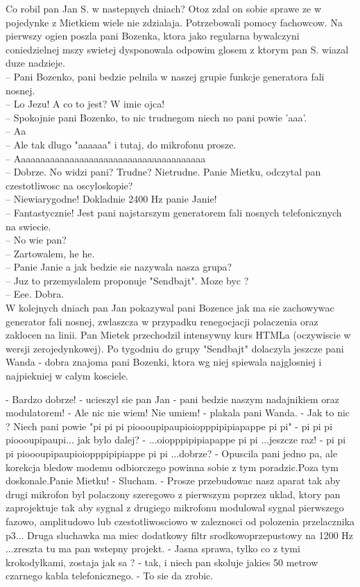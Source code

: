 \documentclass[a4paper,polish,titlepage,12pt]{article}
\begin{document}
Co robil pan Jan S. w nastepnych dniach? Otoz zdal on sobie sprawe ze w pojedynke z Mietkiem wiele nie zdzialaja. Potrzebowali pomocy fachowcow. Na pierwszy ogien poszla pani Bozenka, ktora jako regularna bywalczyni coniedzielnej mszy swietej dysponowala odpowim glosem z ktorym pan S. wiazal duze nadzieje.\\
-- Pani Bozenko, pani bedzie pelnila w naszej grupie funkcje generatora fali nosnej.\\
-- Lo Jezu! A co to jest? W imie ojca!\\
-- Spokojnie pani Bozenko, to nic trudnegom niech no pani powie 'aaa'.\\
-- Aa\\
-- Ale tak dlugo "aaaaaa" i tutaj, do mikrofonu prosze.\\
-- Aaaaaaaaaaaaaaaaaaaaaaaaaaaaaaaaaaaaaaa\\
-- Dobrze. No widzi pani? Trudne? Nietrudne. Panie Mietku, odczytal pan czestotliwosc na oscyloskopie?\\
-- Niewiarygodne! Dokladnie 2400 Hz panie Janie!\\
-- Fantastycznie! Jest pani najstarszym generatorem fali nosnych telefonicznych na swiecie.\\
-- No wie pan?\\
-- Zartowalem, he he.\\
-- Panie Janie a jak bedzie sie nazywala nasza grupa?\\
-- Juz to przemyslalem proponuje "Sendbajt". Moze byc ?\\
-- Eee. Dobra.\\

W kolejnych dniach pan Jan pokazywal pani Bozence jak ma sie zachowywac generator fali nosnej, zwlaszcza w przypadku renegocjacji polaczenia oraz zaklocen na linii. Pan Mietek przechodzil intensywny kurs HTMLa (oczywiscie w wersji zerojedynkowej). Po tygodniu do grupy "Sendbajt" dolaczyla jeszcze pani Wanda - dobra znajoma pani Bozenki, ktora wg niej spiewala najglosniej i najpiekniej w calym kosciele.

- Bardzo dobrze! - ucieszyl sie pan Jan - pani bedzie naszym nadajnikiem oraz modulatorem!
- Ale nic nie wiem! Nie umiem! - plakala pani Wanda.
- Jak to nic ? Niech pani powie "pi pi pi pioooupipaupioiopppipipiapappe pi pi"
- pi pi pi pioooupipaupi... jak bylo dalej?
- ...oiopppipipiapappe pi pi ...jeszcze raz!
- pi pi pi pioooupipaupioiopppipipiappe pi pi ...dobrze?
- Opuscila pani jedno pa, ale korekcja bledow modemu odbiorczego powinna sobie z tym poradzic.Poza tym doskonale.Panie Mietku!
- Slucham.
- Prosze przebudowac nasz aparat tak aby drugi mikrofon byl polaczony szeregowo z pierwszym poprzez uklad, ktory pan zaprojektuje tak aby sygnal z drugiego mikrofonu modulowal sygnal pierwszego fazowo, amplitudowo lub czestotliwosciowo w zaleznosci od polozenia przelacznika p3... Druga sluchawka ma miec dodatkowy filtr srodkowoprzepustowy na 1200 Hz ...zreszta tu ma pan wstepny projekt.
- Jasna sprawa, tylko co z tymi krokodylkami, zostaja jak sa ?
- tak, i niech pan skoluje jakies 50 metrow czarnego kabla telefonicznego.
- To sie da zrobic.
\end{document}
